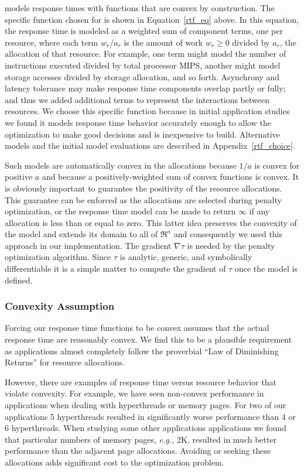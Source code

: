 \pacora models response times with functions that are convex by construction.  The specific function chosen for \pacora is shown in Equation~\ref{rtf_eq} above.  In this equation, the response time is modeled as a weighted sum of component terms, one per resource, where each term $w_r/a_r$ is the amount of work $w_r \geq 0$ divided by $a_r$, the allocation of that resource\cite{Snav}. For example, one term might model the number of instructions executed divided by total processor MIPS, another might model storage accesses divided by storage allocation, and so forth. Asynchrony and latency tolerance may make response time components overlap partly or fully; and thus we added additional terms to represent the interactions between resources. We choose this specific function because in initial application studies we found it models response time behavior accurately enough to allow the optimization to make good decisions and is inexpensive to build.  Alternative models and the initial model evaluations are described in Appendix~\ref{rtf_choice}.

Such models are automatically convex in the allocations because $1/a$ is convex for positive $a$ and because a positively-weighted sum of convex functions is convex.  It is obviously important to guarantee the positivity of the resource allocations. This guarantee can be enforced as the allocations are selected during penalty optimization, or the response time model can be made to return $\infty$ if any allocation is less than or equal to zero. This latter idea preserves the convexity of the model and extends its domain to all of $\Re^n$ and consequently we used this approach in our implementation. The gradient $\nabla\tau$ is needed by the penalty optimization algorithm.
Since $\tau$ is analytic, generic, and symbolically differentiable
it is a simple matter to compute the gradient of $\tau$ once the model is defined.

\subsubsection{Convexity Assumption} Forcing our response time functions to be convex assumes that the actual response time are reasonably convex. We find this to be a plausible requirement as applications almost completely follow the proverbial ``Law of Diminishing Returns'' for resource allocations.

However, there are examples of response time versus resource behavior that violate convexity.   For example, we have seen non-convex performance in applications when dealing with hyperthreads or memory pages.  For two of our applications 5 hyperthreads resulted in significantly worse performance than 4 or 6 hyperthreads.  When studying some other applications applications we found that particular numbers of memory pages, \emph{e.g.,} 2K, resulted in much better performance than the adjacent page allocations.  Avoiding or seeking these allocations adds significant cost to the optimization problem.

